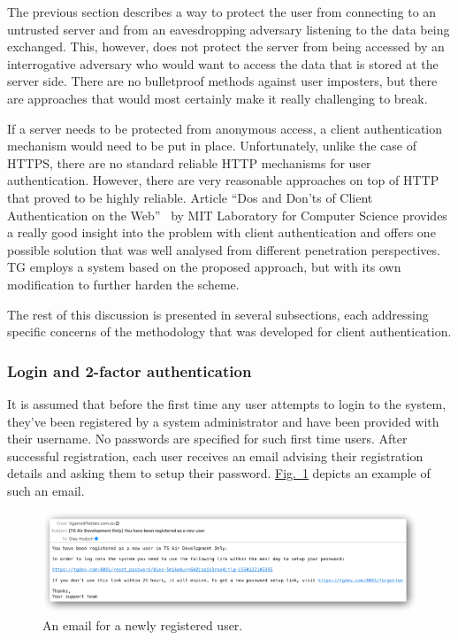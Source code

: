 \documentclass[a4paper,12pt,oneside,openright]{memoir}
\begin{document}
	The previous section describes a way to protect the user from connecting to an untrusted server and from an eavesdropping adversary listening to the data being exchanged.
	This, however, does not protect the server from being accessed by an interrogative adversary who would want to access the data that is stored at the server side.
	There are no bulletproof methods against user imposters, but there are approaches that would most certainly make it really challenging to break.

	If a server needs to be protected from anonymous access, a client authentication mechanism would need to be put in place.
	Unfortunately, unlike the case of HTTPS, there are no standard reliable HTTP mechanisms for user authentication.
	However, there are very reasonable approaches on top of HTTP that proved to be highly reliable.
	Article ``Dos and Don’ts of Client Authentication on the Web''~\cite{MIT} by MIT Laboratory for Computer Science provides a really good insight into the problem with client authentication and offers one possible solution that was well analysed from different penetration perspectives.
	TG employs a system based on the proposed approach, but with its own modification to further harden the scheme.

	The rest of this discussion is presented in several subsections, each addressing specific concerns of the methodology that was developed for client authentication.

\subsubsection*{Login and 2-factor authentication}
	It is assumed that before the first time any user attempts to login to the system, they've been registered by a system administrator and have been provided with their username.
	No passwords are specified for such first time users.
	After successful registration, each user receives an email advising their registration details and asking them to setup their password.
	\hyperref[sec:02:fig:2]{Fig.~\ref*{sec:02:fig:2}} depicts an example of such an email.

	\begin{figure}[h!tbp]
	\centering
	\includegraphics[width=1\linewidth]{images/02-new-user-registration-email.png}
	\caption{An email for a newly registered user.}\label{sec:02:fig:2}
	\end{figure}
\end{document}
